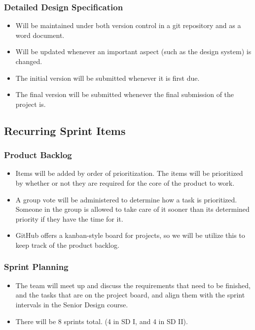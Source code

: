 \subsubsection{Detailed Design Specification}
\begin{itemize}
  \item Will be maintained under both version control in a git repository and as a word document.
  \item Will be updated whenever an important aspect (such as the design system) is changed.
  \item The initial version will be submitted whenever it is first due.
  \item The final version will be submitted whenever the final submission of the project is.
\end{itemize}

\subsection{Recurring Sprint Items}
\subsubsection{Product Backlog}
\begin{itemize}
  \item Items will be added by order of prioritization. The items will be prioritized by whether or not they are required for the core of the product to work.
  \item A group vote will be administered to determine how a task is prioritized. Someone in the group is allowed to take care of it sooner than its determined priority if they have the time for it.
  \item GitHub offers a kanban-style board for projects, so we will be utilize this to keep track of the product backlog.
\end{itemize}

\subsubsection{Sprint Planning}
\begin{itemize}
  \item The team will meet up and discuss the requirements that need to be finished, and the tasks that are on the project board, and align them with the sprint intervals in the Senior Design course.
  \item There will be 8 sprints total. (4 in SD I, and 4 in SD II).
\end{itemize}

